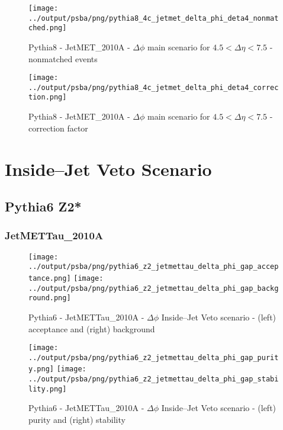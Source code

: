\documentclass[11pt]{book}
\begin{document}
\begin{figure}[ht]
\centering
\texttt{[image: ../output/psba/png/pythia8\_4c\_jetmet\_delta\_phi\_deta4\_nonmatched.png]}
\caption{Pythia8 - JetMET\_2010A - $\Delta\phi$ main scenario for $4.5 < \Delta\eta < 7.5$ - nonmatched events}
\label{fig:p8_jetmet_delta_phi_deta4_nonmatched}
\end{figure}

\begin{figure}[ht]
\centering
\texttt{[image: ../output/psba/png/pythia8\_4c\_jetmet\_delta\_phi\_deta4\_correction.png]}
\caption{Pythia8 - JetMET\_2010A - $\Delta\phi$ main scenario for $4.5 < \Delta\eta < 7.5$ - correction factor}
\label{fig:p8_jetmet_delta_phi_deta4_correction}
\end{figure}



\clearpage
\chapter{Inside--Jet Veto Scenario}
\section{Pythia6 Z2*}
\subsection{JetMETTau\_2010A}

\begin{figure}[ht]
\centering
\texttt{[image: ../output/psba/png/pythia6\_z2\_jetmettau\_delta\_phi\_gap\_acceptance.png]}
\texttt{[image: ../output/psba/png/pythia6\_z2\_jetmettau\_delta\_phi\_gap\_background.png]}
\caption{Pythia6 - JetMETTau\_2010A - $\Delta\phi$ Inside--Jet Veto scenario - (left) acceptance and (right) background}
\label{fig:p6_jetmettau_delta_phi_gap_ab}
\end{figure}

\begin{figure}[ht]
\centering
\texttt{[image: ../output/psba/png/pythia6\_z2\_jetmettau\_delta\_phi\_gap\_purity.png]}
\texttt{[image: ../output/psba/png/pythia6\_z2\_jetmettau\_delta\_phi\_gap\_stability.png]}
\caption{Pythia6 - JetMETTau\_2010A - $\Delta\phi$ Inside--Jet Veto scenario - (left) purity and (right) stability}
\label{fig:p6_jetmettau_delta_phi_gap_ps}
\end{figure}
\end{document}
